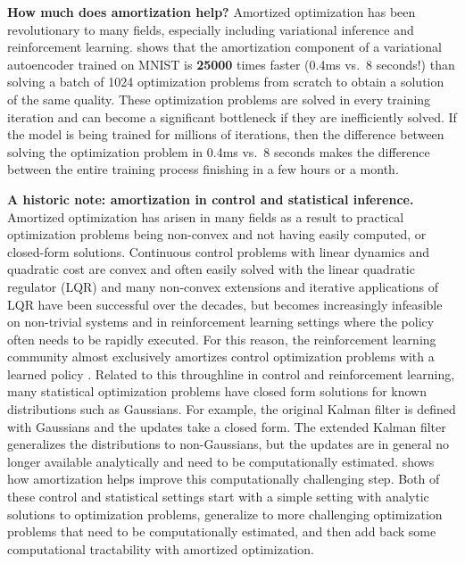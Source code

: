 \textbf{How much does amortization help?}
Amortized optimization has been revolutionary to many fields,
especially including variational inference and reinforcement
learning.
 shows that the amortization component
of a variational autoencoder trained on MNIST is \textbf{25000}
times faster (0.4ms vs.~8 seconds!) than solving a batch of
1024 optimization problems from scratch to obtain a
solution of the same quality.
These optimization problems are solved in every training iteration
and can become a significant bottleneck if they are
inefficiently solved.
If the model is being trained for millions of iterations,
then the difference between solving the optimization problem
in 0.4ms vs.~8 seconds makes the difference between the
entire training process finishing in a few hours or a month.

\textbf{A historic note: amortization in control and statistical inference.}
Amortized optimization has arisen in many fields as a result
to practical optimization problems being non-convex and not
having easily computed, or closed-form solutions.
Continuous control problems with linear dynamics and quadratic
cost are convex and often easily solved with the linear
quadratic regulator (LQR) and many non-convex extensions and
iterative applications of LQR have been successful over
the decades, but becomes increasingly infeasible on
non-trivial systems and in reinforcement learning settings
where the policy often needs to be rapidly executed.
For this reason, the reinforcement learning community almost
exclusively amortizes control optimization problems with
a learned policy \citep{sutton2018reinforcement}.
Related to this throughline in control and reinforcement learning,
many statistical optimization problems have closed
form solutions for known distributions such as Gaussians.
For example, the original Kalman filter is defined with Gaussians
and the updates take a closed form. The extended Kalman filter
generalizes the distributions to non-Gaussians, but the updates
are in general no longer available analytically and need to be
computationally estimated.
\citet{marino2018general} shows how amortization helps improve
this computationally challenging step.
Both of these control and statistical settings start with a
simple setting with analytic solutions to optimization problems,
generalize to more challenging optimization problems
that need to be computationally estimated, and then
add back some computational tractability with amortized optimization.



